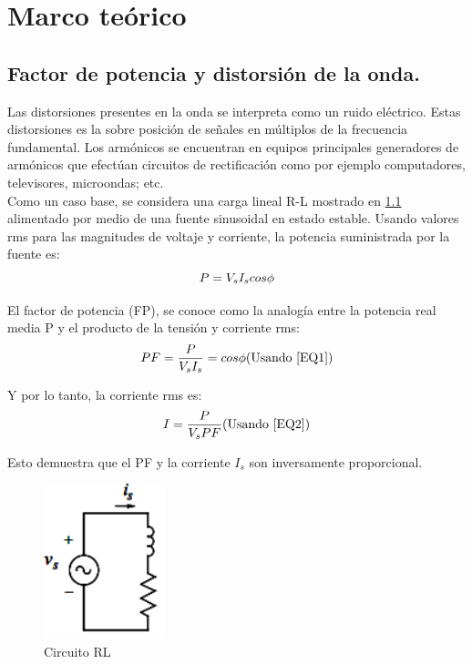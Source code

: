 \newpage{\cleardoublepage}
\chapter{Marco te\'{o}rico}

\section{Factor de potencia y distorsión de la onda.}

Las distorsiones presentes en la onda se interpreta como un ruido eléctrico. Estas distorsiones es la sobre posición de señales en múltiplos de la frecuencia fundamental. Los armónicos se encuentran en equipos principales generadores de armónicos que efectúan circuitos de rectificación como por ejemplo computadores, televisores, microondas; etc. \cite{A28}\\  Como un caso base, se considera una carga lineal R-L mostrado en \ref{fig:RL} alimentado por medio de una fuente sinusoidal en estado estable. Usando valores rms para las magnitudes de voltaje y corriente, la potencia suministrada por la fuente es:\cite{A29}\\
\begin{equation}\label{EQ1}
P=V_{s}I_{s}cos \phi\\
\end{equation}

El factor de potencia (FP), se conoce como la analogía entre la potencia real media P y el producto de la tensión y corriente rms:
\begin{equation}\label{EQ2}
PF=\frac{P}{V_{s}I_{s}}=cos\phi\\
$(Usando \ref{EQ1})$  \\
\end{equation} 

Y por lo tanto, la corriente rms es:\\

\begin{equation}\label{EQ3}
I=\frac{P}{V_{s}PF}\\
$(Usando \ref{EQ2})$  \\
\end{equation} 

Esto demuestra que el PF y la corriente $I_{s}$ son inversamente proporcional. \\

\begin{figure}[H]
\centering
\includegraphics{2Marco/CargaRL}
\caption{ Circuito RL  } 
\label{fig:RL}
\end{figure} 



